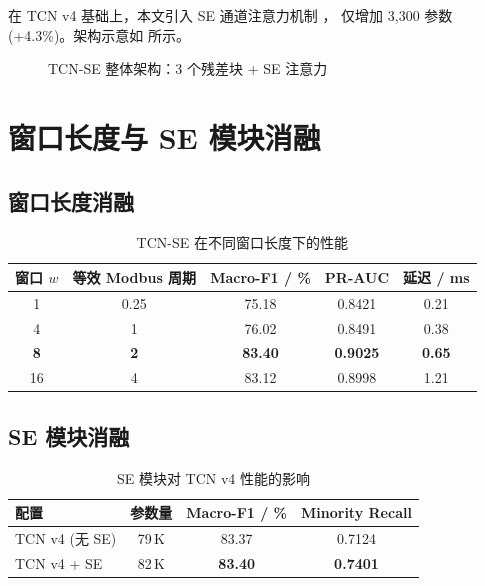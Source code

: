 \par 在 TCN v4 基础上，本文引入 SE 通道注意力机制 \cite{ref:hu2018senet}，
仅增加 3{,}300 参数 (+4.3\%)。架构示意如  所示。

\begin{figure}[H]
\centering
{}
\caption{TCN-SE 整体架构：3 个残差块 + SE 注意力}
\label{fig:tcn_se}
\end{figure}

\section{窗口长度与 SE 模块消融}
\label{sec:tcn_ablation}

\subsection{窗口长度消融}
\label{sec:win_ablation}

\begin{table}[H]
\centering
\caption{TCN-SE 在不同窗口长度下的性能}
\label{tab:win_ablation}
\begin{tabular}{ccccc}
\toprule
窗口 $w$ & 等效 Modbus 周期 & Macro-F1 / \% & PR-AUC & 延迟 / ms \\
\midrule
1 & 0.25 & 75.18 & 0.8421 & 0.21 \\
4 & 1 & 76.02 & 0.8491 & 0.38 \\
\textbf{8} & \textbf{2} & \textbf{83.40} & \textbf{0.9025} & \textbf{0.65} \\
16 & 4 & 83.12 & 0.8998 & 1.21 \\
\bottomrule
\end{tabular}
\end{table}


\subsection{SE 模块消融}
\label{sec:se_ablation}

\begin{table}[H]
\centering
\caption{SE 模块对 TCN v4 性能的影响}
\label{tab:se_ablation}
\begin{tabular}{lccc}
\toprule
配置 & 参数量 & Macro-F1 / \% & Minority Recall \\
\midrule
TCN v4 (无 SE) & 79\,K & 83.37 & 0.7124 \\
TCN v4 + SE & 82\,K & \textbf{83.40} & \textbf{0.7401} \\
\bottomrule
\end{tabular}
\end{table}

